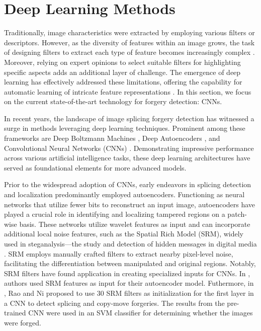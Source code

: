   \section{Deep Learning Methods } \label{sec:s2}

Traditionally, image characteristics were extracted by employing various filters or descriptors. However, as the diversity of features within an image grows, the task of designing filters to extract each type of feature becomes increasingly complex \cite{MeenaTyagi2021}. Moreover, relying on expert opinions to select suitable filters for highlighting specific aspects adds an additional layer of challenge. The emergence of deep learning has effectively addressed these limitations, offering the capability for automatic learning of intricate feature representations \cite{Wicht2018}. In this section, we focus on the current state-of-the-art technology for forgery detection: CNNs.

In recent years, the landscape of image splicing forgery detection has witnessed a surge in methods leveraging deep learning techniques. Prominent among these frameworks are Deep Boltzmann Machines \cite{salakhutdinov2009}, Deep Autoencoders \cite{larochelle2009exploring}, and Convolutional Neural Networks (CNNs) \cite{ciresan2011flexible, krizhevsky2012imagenet, ji2012}. Demonstrating impressive performance across various artificial intelligence tasks, these deep learning architectures have served as foundational elements for more advanced models.

Prior to the widespread adoption of CNNs, early endeavors in splicing detection and localization predominantly employed autoencoders. Functioning as neural networks that utilize fewer bits to reconstruct an input image, autoencoders have played a crucial role in identifying and localizing tampered regions on a patch-wise basis. These networks utilize wavelet features as input and can incorporate additional local noise features, such as the Spatial Rich Model (SRM), widely used in steganalysis—the study and detection of hidden messages in digital media \cite{fridrich2012rich}. SRM employs manually crafted filters to extract nearby pixel-level noise, facilitating the differentiation between manipulated and original regions. Notably, SRM filters have found application in creating specialized inputs for CNNs. In \cite{Cozzolino2016}, authors used SRM features as input for their autoencoder model. Futhermore, in \cite{rao2016}, Rao and Ni proposed to use 30 SRM filters as initialization for the first layer in a CNN to detect splicing and copy-move forgeries. The results from the pre-trained CNN were used in an SVM classifier for determining whether the images were forged.

